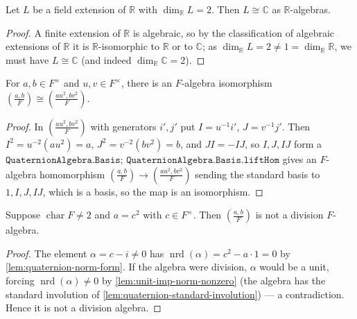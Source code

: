 \begin{lemma}
    \label{lem:real-quadratic-ext-eq-C}
    Let $L$ be a field extension of $\mathbb{R}$ with $\dim_{\mathbb{R}} L = 2$.
    Then $L \cong \mathbb{C}$ as $\mathbb{R}$-algebras.
\end{lemma}
\begin{proof}
    A finite extension of $\mathbb{R}$ is algebraic, so by the classification of
    algebraic extensions of $\mathbb{R}$ it is $\mathbb{R}$-isomorphic to
    $\mathbb{R}$ or to $\mathbb{C}$; as $\dim_{\mathbb{R}} L = 2 \neq 1 =
    \dim_{\mathbb{R}} \mathbb{R}$, we must have $L \cong \mathbb{C}$ (and indeed
    $\dim_{\mathbb{R}} \mathbb{C} = 2$).
\end{proof}

\begin{lemma}
    \label{lem:quaternion-square-rescale}
    For $a, b \in F^\times$ and $u, v \in F^\times$, there is an $F$-algebra
    isomorphism $\left(\frac{a,b}{F}\right) \cong \left(\frac{au^2, bv^2}{F}\right)$.
\end{lemma}
\begin{proof}
    In $\left(\frac{au^2, bv^2}{F}\right)$ with generators $i', j'$ put
    $I = u^{-1}i'$, $J = v^{-1}j'$. Then $I^2 = u^{-2}(au^2) = a$, $J^2 =
    v^{-2}(bv^2) = b$, and $JI = -IJ$, so $I, J, IJ$ form a
    $\texttt{QuaternionAlgebra.Basis}$; $\texttt{QuaternionAlgebra.Basis.liftHom}$
    gives an $F$-algebra homomorphism $\left(\frac{a,b}{F}\right) \to
    \left(\frac{au^2, bv^2}{F}\right)$ sending the standard basis to $1, I, J, IJ$,
    which is a basis, so the map is an isomorphism.
\end{proof}

\begin{lemma}
    \label{lem:quaternion-isotropic-not-division}
    Suppose $\operatorname{char} F \neq 2$ and $a = c^2$ with $c \in F^\times$. Then
    $\left(\frac{a,b}{F}\right)$ is not a division $F$-algebra.
\end{lemma}
\begin{proof}
    The element $\alpha = c - i \neq 0$ has $\operatorname{nrd}(\alpha) = c^2 - a
    \cdot 1 = 0$ by \ref{lem:quaternion-norm-form}. If the algebra were division,
    $\alpha$ would be a unit, forcing $\operatorname{nrd}(\alpha) \neq 0$ by
    \ref{lem:unit-imp-norm-nonzero} (the algebra has the standard involution of
    \ref{lem:quaternion-standard-involution}) --- a contradiction. Hence it is not a
    division algebra.
\end{proof}

